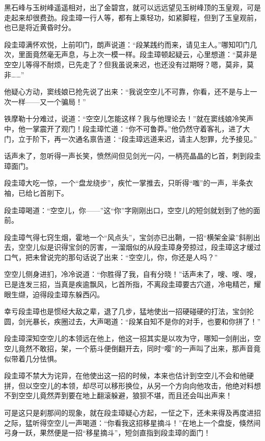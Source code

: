 \documentclass[12pt,oneside]{book}
\begin{document}
黑石峰与玉树峰遥遥相对，出了金碧宫，就可以远远望见玉树峰顶的玉皇观，可是走起来却很费劲。段圭璋一行人等，都有上乘轻功，如紧脚程，但到了玉皇观前，也已是将近黄昏时分。

段圭璋满怀欢悦，上前叩门，朗声说道：``段某践约而来，请见主人。''哪知叩门几次，里面竟然毫无声息，与上次一模一样。段圭璋顿起疑云，心里想道：``莫非是空空儿等得不耐烦，已先走了？但我虽说来迟，也还没有过期呀？嗯，莫非，莫非\ldots\ldots{}''

他疑心方动，窦线娘已抢先说了出来：``我说空空儿不可靠，你看，还不是与上一次一样------又一个骗局！''

铁摩勒十分难过，说道：``空空儿怎能这样？我与他理论去！''就在窦线娘冷笑声中，他一掌震开了观门！段圭璋忙道：``你不可鲁莽。''他仍然守着客礼，进了大门，立于阶下，再一次通名禀告道：``段圭璋远道来迟，请主人恕罪，允予接见。''

话声未了，忽听得一声长笑，愤然间但见剑光一闪，一柄亮晶晶的匕首，刺到段圭璋面门。

段圭璋大吃一惊，一个``盘龙绕步''，疾忙一掌推去，只昕得``嗤''的一声，半条衣袖，已给匕首削下。

段圭璋喝道：``空空儿，你------''这``你''字刚刚出口，空空儿的短剑就划到了他的面前。

段圭璋气得七窍生烟，霍地一个``风点头''，宝剑亦已出鞘，一招``横架金粱''斜削出去，空空儿似是识得宝剑的厉害，一溜烟似的从段圭璋身旁掠过，段圭璋这才缓过口气，把未曾说完的那句话说了出来：``空空儿，你，你还是人吗？''

空空儿侧身进扪，冷冷说道：``你胜得了我，自有分晓！''话声未了，嗖、嗖、嗖，已是连发三招，当真是疾逾飘风，匕首所指，不离段圭璋要古穴道，冷电精芒，耀眼生缬，迫得段圭璋东躲西闪。

幸亏段圭璋也是惯经大敌之辈，退了几步，猛地使出一招硬碰硬的打法，宝剑抡圆，剑光暴长，疾圈过去，大声喝道：``段某自知不是你的对手，也要和你拼了！''

段圭璋深知空空儿的本领远在他上，他这一招其实是以攻为守，哪知一剑削出，空空儿竟然不敢招，架，一个筋斗便倒翻开去，同时``嘤''的一声叫了出来，那声音竟似带着几分怯惧。

段圭璋不禁大为诧异，在他使出这一招的时候，本来也估计到空空儿不会和他硬拼，但以空空儿的本领，却尽可以移形换位，从另一个方向向他攻击，他绝对料想不到空空儿竟然弄到要在地上翻滚躲避，狼狈不堪，而且还会叫出声来！

可是这只是刹那间的现象，就在段圭璋疑心方起，一怔之下，还未来得及再度进招之际，猛听得空空儿一声喝道：``你看我这招移星摘斗！''在地上一个盘旋，倏然间弓身一跃，果然便是一招``移星摘斗''，短剑直指到段圭璋的面门！
\end{document}

